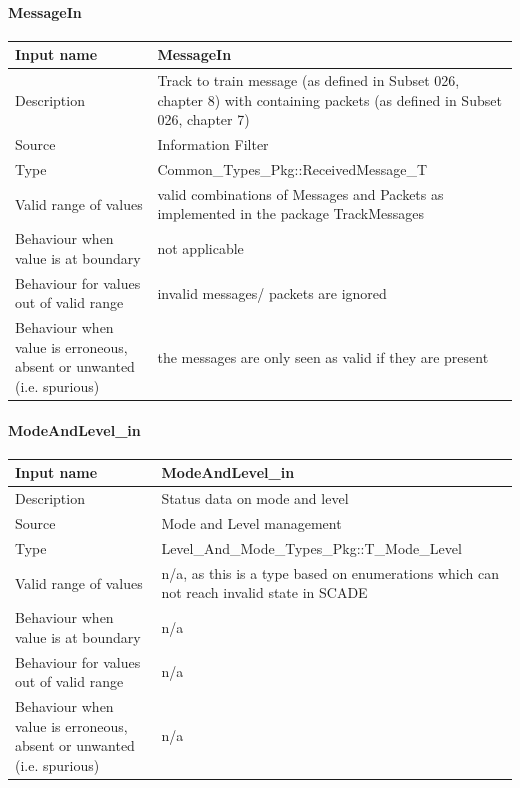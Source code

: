\paragraph{MessageIn}

\begin{longtable}{p{}p{}}
\toprule
Input name				& MessageIn \\
\midrule
Description				& Track to train message (as defined in Subset 026, chapter 8) with containing packets (as defined in Subset 026, chapter 7) \\
\midrule
Source					& Information Filter\\ 
\midrule
Type					& Common\_Types\_Pkg::ReceivedMessage\_T \\
\midrule
Valid range of values	& valid combinations of Messages and Packets as implemented in the package TrackMessages \\
\midrule
Behaviour when value is at boundary	& not applicable\\
\midrule
Behaviour for values out of valid range	& invalid messages/ packets are ignored \\
\midrule
Behaviour when value is erroneous, absent or unwanted (i.e. spurious) & the messages are only seen as valid if they are present \\
\bottomrule
\end{longtable}


\paragraph{ModeAndLevel\_in}

\begin{longtable}{p{}p{}}
\toprule
Input name				& ModeAndLevel\_in \\
\midrule
Description				& Status data on mode and level\\
\midrule
Source					& Mode and Level management \\ 
\midrule
Type					& Level\_And\_Mode\_Types\_Pkg::T\_Mode\_Level \\
\midrule
Valid range of values	& n/a, as this is a type based on enumerations which can not reach invalid state in SCADE \\
\midrule
Behaviour when value is at boundary	& n/a\\
\midrule
Behaviour for values out of valid range	& n/a\\
\midrule
Behaviour when value is erroneous, absent or unwanted (i.e. spurious) & n/a\\
\bottomrule
\end{longtable}

